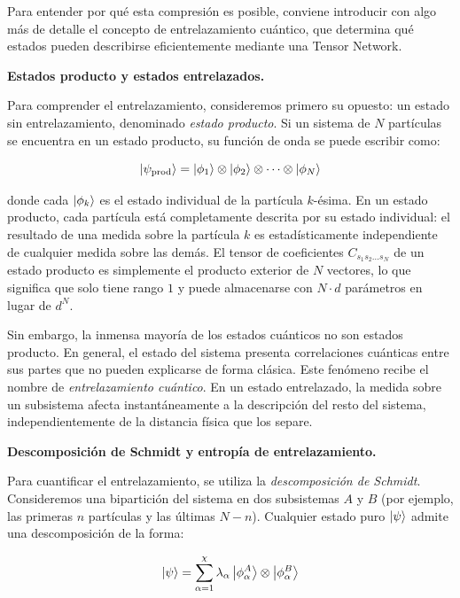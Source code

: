 \documentclass[11pt,a4paper]{report}
\begin{document}
Para entender por qué esta compresión es posible, conviene introducir con algo más de detalle el concepto de entrelazamiento cuántico, que determina qué estados pueden describirse eficientemente mediante una Tensor Network.

\noindent\textbf{Estados producto y estados entrelazados.}
 
Para comprender el entrelazamiento, consideremos primero su opuesto: un estado sin entrelazamiento, denominado \textit{estado producto}. Si un sistema de $N$ partículas se encuentra en un estado producto, su función de onda se puede escribir como:
 
\begin{equation} \label{eq: estado_producto}
    \ket{\psi_{\text{prod}}} = \ket{\phi_1} \otimes \ket{\phi_2} \otimes \cdots \otimes \ket{\phi_N}
\end{equation}
 
donde cada $\ket{\phi_k}$ es el estado individual de la partícula $k$-ésima. En un estado producto, cada partícula está completamente descrita por su estado individual: el resultado de una medida sobre la partícula $k$ es estadísticamente independiente de cualquier medida sobre las demás. El tensor de coeficientes $C_{s_1 s_2 \ldots s_N}$ de un estado producto es simplemente el producto exterior de $N$ vectores, lo que significa que solo tiene rango $1$ y puede almacenarse con $N \cdot d$ parámetros en lugar de $d^N$.
 
Sin embargo, la inmensa mayoría de los estados cuánticos no son estados producto. En general, el estado del sistema presenta correlaciones cuánticas entre sus partes que no pueden explicarse de forma clásica. Este fenómeno recibe el nombre de \textit{entrelazamiento cuántico}. En un estado entrelazado, la medida sobre un subsistema afecta instantáneamente a la descripción del resto del sistema, independientemente de la distancia física que los separe.
 
\noindent\textbf{Descomposición de Schmidt y entropía de entrelazamiento.}
 
Para cuantificar el entrelazamiento, se utiliza la \textit{descomposición de Schmidt}. Consideremos una bipartición del sistema en dos subsistemas $A$ y $B$ (por ejemplo, las primeras $n$ partículas y las últimas $N-n$). Cualquier estado puro $\ket{\psi}$ admite una descomposición de la forma:
 
\begin{equation} \label{eq: schmidt}
    \ket{\psi} = \sum_{\alpha=1}^{\chi} \lambda_\alpha \ket{\phi_\alpha^A} \otimes \ket{\phi_\alpha^B}
\end{equation}
 
\end{document}
